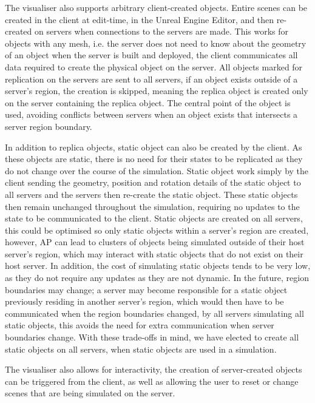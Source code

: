 The visualiser also supports arbitrary client-created objects. Entire scenes can be created in the client at edit-time, in the Unreal Engine Editor, and then re-created on servers when connections to the servers are made. This works for objects with any mesh, i.e. the server does not need to know about the geometry of an object when the server is built and deployed, the client communicates all data required to create the physical object on the server. All objects marked for replication on the servers are sent to all servers, if an object exists outside of a server's region, the creation is skipped, meaning the replica object is created only on the server containing the replica object. The central point of the object is used, avoiding conflicts between servers when an object exists that intersects a server region boundary.

In addition to replica objects, static object can also be created by the client. As these objects are static, there is no need for their states to be replicated as they do not change over the course of the simulation. Static object work simply by the client sending the geometry, position and rotation details of the static object to all servers and the servers then re-create the static object. These static objects then remain unchanged throughout the simulation, requiring no updates to the state to be communicated to the client. Static objects are created on all servers, this could be optimised so only static objects within a server's region are created, however, AP can lead to clusters of objects being simulated outside of their host server's region, which may interact with static objects that do not exist on their host server. In addition, the cost of simulating static objects tends to be very low, as they do not require any updates as they are not dynamic. In the future, region boundaries may change; a server may become responsible for a static object previously residing in another server's region, which would then have to be communicated when the region boundaries changed, by all servers simulating all static objects, this avoids the need for extra communication when server boundaries change. With these trade-offs in mind, we have elected to create all static objects on all servers, when static objects are used in a simulation.

The visualiser also allows for interactivity, the creation of server-created objects can be triggered from the client, as well as allowing the user to reset or change scenes that are being simulated on the server.


